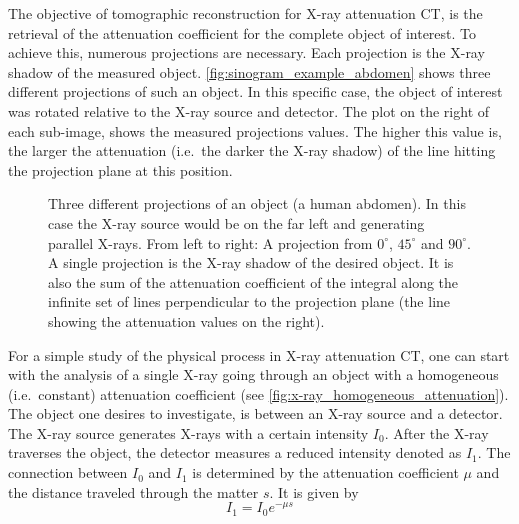 The objective of tomographic reconstruction for X-ray attenuation CT, is the retrieval of the
attenuation coefficient for the complete object of interest. To achieve this, numerous projections
are necessary. Each projection is the X-ray shadow of the measured object.
\autoref{fig:sinogram_example_abdomen} shows three different projections of such an object. In this
specific case, the object of interest was rotated relative to the X-ray source and detector. The
plot on the right of each sub-image, shows the measured projections values. The higher this value
is, the larger the attenuation (i.e.\ the darker the X-ray shadow) of the line hitting the
projection plane at this position.

\begin{figure}
	\centering
	\caption{Three different projections of an object (a human abdomen). In this case the X-ray
		source would be on the far left and generating parallel X-rays. From left to right:
		A projection from \(0^\circ\), \(45^\circ\) and \(90^\circ\). A single projection is
		the X-ray shadow of the desired object. It is also the sum of the attenuation
		coefficient of the integral along the infinite set of lines perpendicular to the
		projection plane (the line showing the attenuation values on the right).
	}\label{fig:sinogram_example_abdomen}
\end{figure}

For a simple study of the physical process in X-ray attenuation CT, one can start with the analysis
of a single X-ray going through an object with a homogeneous (i.e.\ constant) attenuation
coefficient (see \autoref{fig:x-ray_homogeneous_attenuation}). The object one desires to
investigate, is between an X-ray source and a detector. The X-ray source generates X-rays with a
certain intensity \(I_0\). After the X-ray traverses the object, the detector measures a reduced
intensity denoted as \(I_1\). The connection between \(I_0\) and \(I_1\) is determined by the
attenuation coefficient \(\mu\) and the distance traveled through the matter \(s\). It is given by
\[ I_1 = I_0 e^{-\mu s} \]

